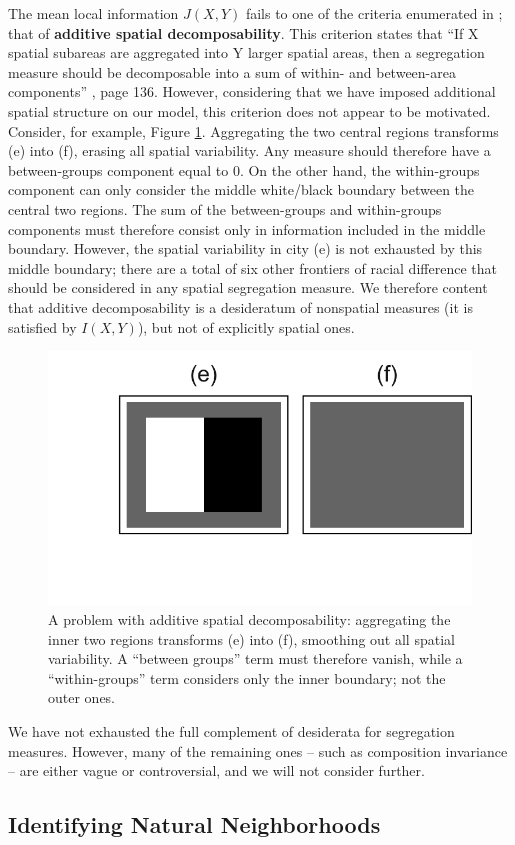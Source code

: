 	The mean local information $J(X,Y)$ fails to one of the criteria enumerated in \cite{Reardon2002,Reardon2004}; that of \textbf{additive spatial decomposability}. This criterion states that ``If X spatial subareas are aggregated into Y larger spatial areas, then a segregation measure should be decomposable into a sum of within- and between-area components'' \cite{Reardon2004}, page 136. However, considering that we have imposed additional spatial structure on our model, this criterion does not appear to be motivated. Consider, for example, Figure \ref{fig:decomposability}. Aggregating the two central regions transforms (e) into (f), erasing all spatial variability. Any measure should therefore have a between-groups component equal to 0. On the other hand, the within-groups component can only consider the middle white/black boundary between the central two regions. The sum of the between-groups and within-groups components must therefore consist only in information included in the middle boundary. However, the spatial variability in city (e) is not exhausted by this middle boundary; there are a total of six other frontiers of racial difference that should be considered in any spatial segregation measure. We therefore content that additive decomposability is a desideratum of nonspatial measures (it is satisfied by $I(X,Y)$), but not of explicitly spatial ones. 
	\begin{figure}
		\centering
		\includegraphics[width=.5\textwidth]{figs/decomposability.png}
		\caption{A problem with additive spatial decomposability: aggregating the inner two regions transforms (e) into (f), smoothing out all spatial variability. A ``between groups'' term must therefore vanish, while a ``within-groups'' term considers only the inner boundary; not the outer ones.}
		\label{fig:decomposability}
	\end{figure}
	We have not exhausted the full complement of desiderata for segregation measures. However, many of the remaining ones -- such as composition invariance -- are either vague or controversial, and we will not consider further. 
\color{black}

\subsection*{Identifying Natural Neighborhoods}
	
